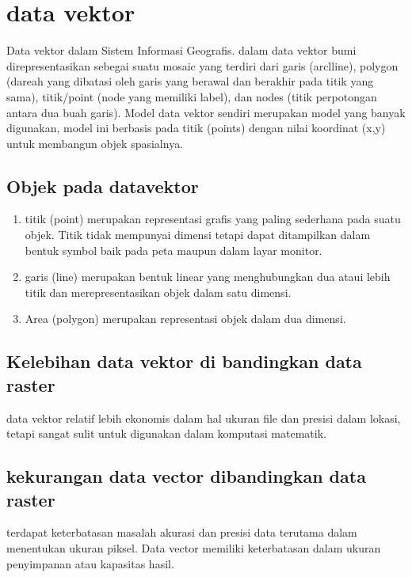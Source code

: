 


\section{data vektor}
  Data vektor dalam Sistem Informasi Geografis. dalam  data vektor bumi direpresentasikan sebegai suatu  mosaic yang terdiri dari garis (arclline), polygon (dareah yang dibatasi oleh garis yang berawal dan berakhir pada titik yang sama), titik/point (node yang memiliki label),  dan nodes (titik perpotongan antara dua buah garis). Model data vektor sendiri merupakan model yang banyak digunakan, model ini berbasis pada titik (points) dengan nilai koordinat (x,y) untuk membangun objek spasialnya. 

\subsection {Objek pada datavektor}
\begin{enumerate}
Objek yang dibangun terbagi menjadi tiga bagian lagi, yaitu berupa titik (point), garis (line), dan area (polygon). 
\item titik (point) merupakan representasi grafis yang paling sederhana pada suatu objek. Titik tidak mempunyai dimensi tetapi dapat ditampilkan dalam bentuk symbol baik pada peta maupun dalam layar monitor.
\item garis (line) merupakan bentuk linear yang menghubungkan dua ataui lebih titik dan merepresentasikan objek dalam satu dimensi. 
\item Area (polygon) merupakan representasi objek dalam dua dimensi.
\end{enumerate}

\subsection {Kelebihan data vektor di bandingkan data raster} 
data vektor relatif lebih ekonomis dalam hal ukuran file dan presisi dalam lokasi, tetapi sangat sulit untuk digunakan dalam komputasi matematik. 

\subsection {kekurangan data vector dibandingkan data raster}
terdapat keterbatasan masalah akurasi dan presisi data terutama dalam menentukan ukuran piksel. Data vector memiliki keterbatasan dalam ukuran penyimpanan atau kapasitas hasil.   

